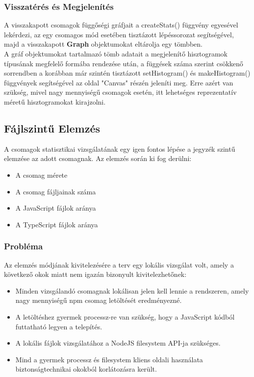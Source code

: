 \subsubsection{Visszatérés és Megjelenítés}

A visszakapott csomagok függőségi gráfjait a createStats() függvény egyesével lekérdezi, az egy csomagos mód esetében tisztázott lépéssorozat segítségével, majd a visszakapott \textbf{Graph} objektumokat eltárolja egy tömbben.\\

A gráf objektumokat tartalmazó tömb adatait a megjelenítő hisztogramok típusának megfelelő formába rendezése után, a függések száma szerint csökkenő sorrendben a korábban már szintén tisztázott setHistogram() és makeHistogram() függvények segítségével az oldal "Canvas" részén jeleníti meg. Erre azért van szükség, mivel nagy mennyiségű csomagok esetén, itt lehetséges reprezentatív méretű hisztogramokat kirajzolni.

\subsection{Fájlszintű Elemzés} 
A csomagok statisztikai vizsgálatának egy igen fontos lépése a jegyzék szintű elemzése az adott csomagnak. Az elemzés során ki fog derülni:
\begin{itemize}
	\item A csomag mérete
	\item A csomag fájljainak száma
	\item A JavaScript fájlok aránya
	\item A TypeScript fájlok aránya
\end{itemize}

\subsubsection{Probléma}
Az elemzés módjának kivitelezésére a terv egy lokális vizsgálat volt, amely a következő okok miatt nem igazán bizonyult kivitelezhetőnek:
\begin{itemize}
	\item Minden vizsgálandó csomagnak lokálisan jelen kell lennie a rendszeren, amely nagy mennyiségű npm csomag letöltését eredményezné.
	\item A letöltéshez gyermek processz-re van szükség, hogy a JavaScript kódból futtatható legyen a telepítés.
	\item A lokális fájlok vizsgálatához a NodeJS filesystem API-ja szükséges.
	\item Mind a gyermek processz és filesystem kliens oldali használata biztonságtechnikai okokból korlátozásra került.
\end{itemize}

